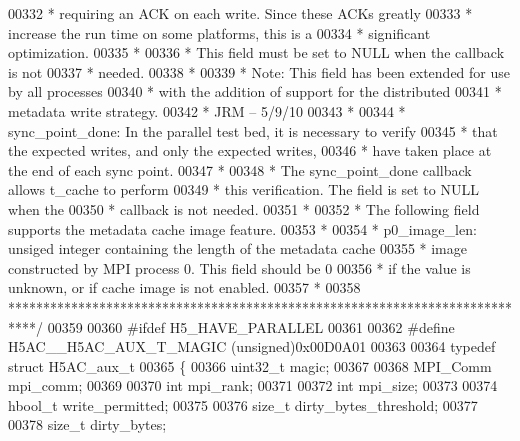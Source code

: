 \begin{DoxyCode}
00332 \textcolor{comment}{ *              requiring an ACK on each write.  Since these ACKs greatly}
00333 \textcolor{comment}{ *              increase the run time on some platforms, this is a}
00334 \textcolor{comment}{ *              significant optimization.}
00335 \textcolor{comment}{ *}
00336 \textcolor{comment}{ *              This field must be set to NULL when the callback is not}
00337 \textcolor{comment}{ *              needed.}
00338 \textcolor{comment}{ *}
00339 \textcolor{comment}{ *      Note: This field has been extended for use by all processes}
00340 \textcolor{comment}{ *            with the addition of support for the distributed }
00341 \textcolor{comment}{ *            metadata write strategy.        }
00342 \textcolor{comment}{ *                                                     JRM -- 5/9/10}
00343 \textcolor{comment}{ *}
00344 \textcolor{comment}{ * sync\_point\_done:  In the parallel test bed, it is necessary to verify}
00345 \textcolor{comment}{ *      that the expected writes, and only the expected writes,}
00346 \textcolor{comment}{ *      have taken place at the end of each sync point.}
00347 \textcolor{comment}{ *}
00348 \textcolor{comment}{ *      The sync\_point\_done callback allows t\_cache to perform }
00349 \textcolor{comment}{ *      this verification.  The field is set to NULL when the }
00350 \textcolor{comment}{ *      callback is not needed.}
00351 \textcolor{comment}{ *}
00352 \textcolor{comment}{ * The following field supports the metadata cache image feature.}
00353 \textcolor{comment}{ *}
00354 \textcolor{comment}{ * p0\_image\_len: unsiged integer containing the length of the metadata cache}
00355 \textcolor{comment}{ *      image constructed by MPI process 0.  This field should be 0}
00356 \textcolor{comment}{ *      if the value is unknown, or if cache image is not enabled.}
00357 \textcolor{comment}{ *}
00358 \textcolor{comment}{ ****************************************************************************/}
00359 
00360 \textcolor{preprocessor}{#ifdef H5\_HAVE\_PARALLEL}
00361 
00362 \textcolor{preprocessor}{#define H5AC\_\_H5AC\_AUX\_T\_MAGIC        (unsigned)0x00D0A01}
00363 
00364 \textcolor{keyword}{typedef} \textcolor{keyword}{struct }H5AC\_aux\_t
00365 \{
00366     uint32\_t    magic;
00367 
00368     MPI\_Comm    mpi\_comm;
00369 
00370     \textcolor{keywordtype}{int}     mpi\_rank;
00371 
00372     \textcolor{keywordtype}{int}     mpi\_size;
00373 
00374     hbool\_t write\_permitted;
00375 
00376     \textcolor{keywordtype}{size\_t}  dirty\_bytes\_threshold;
00377 
00378     \textcolor{keywordtype}{size\_t}  dirty\_bytes;

\end{DoxyCode}
